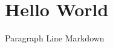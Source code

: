 \documentclass[letter]{article}
\begin{document}
 
\section{Hello World}

Paragraph
Line
Markdown
\end{document}
